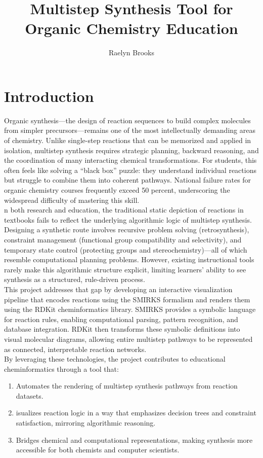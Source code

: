 \documentclass[12pt]{article}
\title{\textbf{Multistep Synthesis Tool for Organic Chemistry Education}}
\author{Raelyn Brooks}
\begin{document}
\maketitle

\section{Introduction}
\indent
Organic synthesis—the design of reaction sequences to build complex molecules from simpler precursors—remains one of the most intellectually demanding areas of chemistry.
Unlike single-step reactions that can be memorized and applied in isolation, multistep synthesis requires strategic planning, backward reasoning, and the coordination of many interacting chemical transformations.
For students, this often feels like solving a “black box” puzzle: they understand individual reactions but struggle to combine them into coherent pathways.
National failure rates for organic chemistry courses frequently exceed 50 percent, underscoring the widespread difficulty of mastering this skill.
\\
\indent
n both research and education, the traditional static depiction of reactions in textbooks fails to reflect the underlying algorithmic logic of multistep synthesis.
Designing a synthetic route involves recursive problem solving (retrosynthesis), constraint management (functional group compatibility and selectivity), and temporary state control (protecting groups and stereochemistry)—all of which resemble computational planning problems.
However, existing instructional tools rarely make this algorithmic structure explicit, limiting learners’ ability to see synthesis as a structured, rule-driven process.
\\
\indent
This project addresses that gap by developing an interactive visualization pipeline that encodes reactions using the SMIRKS formalism and renders them using the RDKit cheminformatics library.
SMIRKS provides a symbolic language for reaction rules, enabling computational parsing, pattern recognition, and database integration.
RDKit then transforms these symbolic definitions into visual molecular diagrams, allowing entire multistep pathways to be represented as connected, interpretable reaction networks.
\\
\indent
By leveraging these technologies, the project contributes to educational cheminformatics through a tool that:
\begin{enumerate}
    \item Automates the rendering of multistep synthesis pathways from reaction datasets.
    \item isualizes reaction logic in a way that emphasizes decision trees and constraint satisfaction, mirroring algorithmic reasoning.
    \item Bridges chemical and computational representations, making synthesis more accessible for both chemists and computer scientists.
\end{enumerate}
\end{document}
